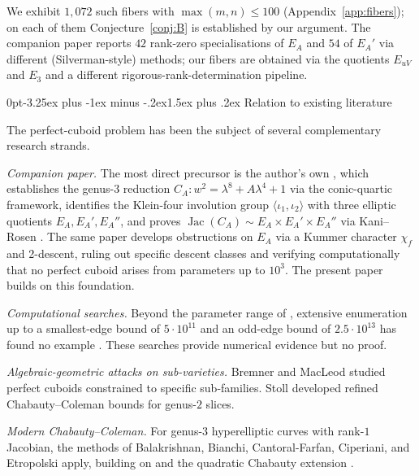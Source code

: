 \documentclass[12pt,a4paper,reqno]{amsart}
\makeatletter
\renewcommand{\subsection}{\@startsection{subsection}{2}%
  {0pt}{-3.25ex plus -1ex minus -.2ex}{1.5ex plus .2ex}%
  {\normalfont\normalsize\bfseries}}
\theoremstyle{plain}
\theoremstyle{definition}
\theoremstyle{remark}
\newcommand{\Jac}{\operatorname{Jac}}
\makeatother
\begin{document}
We exhibit $1{,}072$ such fibers with $\max(m, n) \le 100$ (Appendix~\ref{app:fibers}); on each of them Conjecture~\ref{conj:B} is established by our argument. The companion paper \cite[\S 4.3 and \S 8]{peschmann-paper1} reports $42$ rank-zero specialisations of $E_A$ and $54$ of $E_A'$ via different (Silverman-style) methods; our fibers are obtained via the quotients $E_{uV}$ and $E_3$ and a different rigorous-rank-determination pipeline.

\subsection{Relation to existing literature}

The perfect-cuboid problem has been the subject of several complementary research strands.

\emph{Companion paper.} The most direct precursor is the author's own \cite{peschmann-paper1}, which establishes the genus-$3$ reduction $C_A: w^2 = \lambda^8 + A\lambda^4 + 1$ via the conic-quartic framework, identifies the Klein-four involution group $\langle \iota_1, \iota_2 \rangle$ with three elliptic quotients $E_A, E_A', E_A''$, and proves $\Jac(C_A) \sim E_A \times E_A' \times E_A''$ via Kani--Rosen \cite{kani-rosen}. The same paper develops obstructions on $E_A$ via a Kummer character $\chi_f$ and 2-descent, ruling out specific descent classes and verifying computationally that no perfect cuboid arises from parameters up to $10^3$. The present paper builds on this foundation.

\emph{Computational searches.} Beyond the parameter range of \cite{peschmann-paper1}, extensive enumeration up to a smallest-edge bound of $5 \cdot 10^{11}$ and an odd-edge bound of $2.5 \cdot 10^{13}$ has found no example \cite{rathbun, matson}. These searches provide numerical evidence but no proof.

\emph{Algebraic-geometric attacks on sub-varieties.} Bremner and MacLeod \cite{bremner-macleod} studied perfect cuboids constrained to specific sub-families. Stoll \cite{stoll-twists} developed refined Chabauty--Coleman bounds for genus-$2$ slices.

\emph{Modern Chabauty--Coleman.} For genus-$3$ hyperelliptic curves with rank-$1$ Jacobian, the methods of Balakrishnan, Bianchi, Cantoral-Farfan, Ciperiani, and Etropolski \cite{balakrishnan-win4} apply, building on \cite{coleman1985} and the quadratic Chabauty extension \cite{balakrishnan-dogra-mueller-tuitman}.
\end{document}
